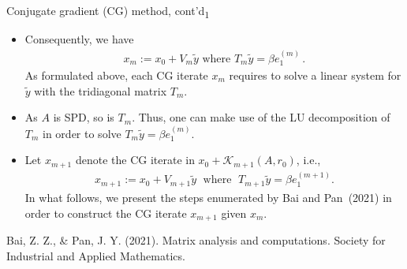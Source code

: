 \documentclass[t,usepdftitle=false]{beamer}
\begin{document}
\begin{frame}{Conjugate gradient (CG) method, cont'd\textsubscript{1}}
\begin{itemize}
\item[]Consequently, we have
\begin{align*}
\boxed{x_m:=x_0+V_m\tilde{y}
\text{ where }
T_m\tilde{y}=\beta e_1^{(m)}}\,.
\end{align*}
As formulated above, each CG iterate $x_m$ requires to solve a linear system for $\tilde{y}$ with the tridiagonal matrix $T_m$.
\item[] As $A$ is SPD, so is $T_m$.
Thus, one can make use of the LU decomposition of $T_m$ in order to solve $T_m\tilde{y}=\beta e_1^{(m)}$.
\item[] Let $x_{m+1}$ denote the CG iterate in $x_0+\mathcal{K}_{m+1}(A,r_0)$, i.e.,
\begin{align*}
x_{m+1}:=x_0+V_{m+1}\tilde{y}
\;\text{ where }\;
T_{m+1}\tilde{y}=\beta e_1^{(m+1)}.
\end{align*}
In what follows, we present the steps enumerated by Bai and Pan~(2021) in order to construct the CG iterate $x_{m+1}$ given $x_m$.
\end{itemize}
\smallskip
\tiny{Bai, Z. Z., \& Pan, J. Y. (2021). Matrix analysis and computations. Society for Industrial and Applied Mathematics.}
\end{frame}
\end{document}
